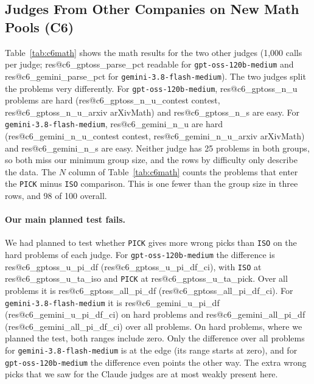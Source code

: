 \documentclass[10pt,twocolumn]{article}
\makeatletter
\newcommand{\res}[1]{\csname res@#1\endcsname}
\makeatother
\begin{document}
\subsection{Judges From Other Companies on New Math Pools (C6)}
\label{sec:c6}
Table~\ref{tab:c6math} shows the math results for the two other judges (1,000 calls per judge; \res{c6_gptoss_parse_pct} readable for \texttt{gpt-oss-120b-medium} and \res{c6_gemini_parse_pct} for \texttt{gemini-3.8-flash-medium}). The two judges split the problems very differently. For \texttt{gpt-oss-120b-medium}, \res{c6_gptoss_n_u} problems are hard (\res{c6_gptoss_n_u_contest} contest, \res{c6_gptoss_n_u_arxiv} arXivMath) and \res{c6_gptoss_n_s} are easy. For \texttt{gemini-3.8-flash-medium}, \res{c6_gemini_n_u} are hard (\res{c6_gemini_n_u_contest} contest, \res{c6_gemini_n_u_arxiv} arXivMath) and \res{c6_gemini_n_s} are easy. Neither judge has 25 problems in both groups, so both miss our minimum group size, and the rows by difficulty only describe the data. The $N$ column of Table~\ref{tab:c6math} counts the problems that enter the \texttt{PICK} minus \texttt{ISO} comparison. This is one fewer than the group size in three rows, and 98 of 100 overall.

\paragraph{Our main planned test fails.} We had planned to test whether \texttt{PICK} gives more wrong picks than \texttt{ISO} on the hard problems of each judge. For \texttt{gpt-oss-120b-medium} the difference is \res{c6_gptoss_u_pi_df} (\res{c6_gptoss_u_pi_df_ci}), with \texttt{ISO} at \res{c6_gptoss_u_ta_iso} and \texttt{PICK} at \res{c6_gptoss_u_ta_pick}. Over all problems it is \res{c6_gptoss_all_pi_df} (\res{c6_gptoss_all_pi_df_ci}). For \texttt{gemini-3.8-flash-medium} it is \res{c6_gemini_u_pi_df} (\res{c6_gemini_u_pi_df_ci}) on hard problems and \res{c6_gemini_all_pi_df} (\res{c6_gemini_all_pi_df_ci}) over all problems. On hard problems, where we planned the test, both ranges include zero. Only the difference over all problems for \texttt{gemini-3.8-flash-medium} is at the edge (its range starts at zero), and for \texttt{gpt-oss-120b-medium} the difference even points the other way. The extra wrong picks that we saw for the Claude judges are at most weakly present here.
\end{document}
